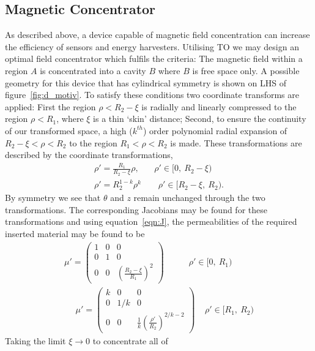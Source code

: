 \documentclass[11pt]{iopart}
\begin{document}
\subsection{Magnetic Concentrator}
As described above, a device capable of magnetic field concentration
can increase the efficiency of sensors and energy harvesters.
Utilising TO we may design an optimal field concentrator which fulfils
the criteria: The magnetic field within a region $A$ is concentrated
into a cavity $B$ where $B$ is free space only. A possible geometry
for this device that has cylindrical symmetry is shown on LHS of
figure~\ref{fig:d_motiv}.  To satisfy these conditions two coordinate
transforms are applied: First the region $\rho < R_2 - \xi$ is
radially and linearly compressed to the region $\rho < R_1$, where
$\xi$ is a thin `skin' distance; Second, to ensure the continuity of
our transformed space, a high ($k^{th}$) order polynomial radial
expansion of $R_2 - \xi < \rho < R_2$ to the region $R_1 < \rho < R_2$
is made. These transformations are described by the coordinate
transformations,
\begin{equation}
  \label{eqn:transform}
  \begin{split}
\rho' = \frac{R_1}{R_2-\xi}\rho,~~~~~~~~\rho'\in[0,~R_2-\xi)~~\\
\rho' = R_2^{1-k}\rho^k~~~~~~~~~\rho'\in[R_2-\xi,~R_2).
  \end{split}
\end{equation}
By symmetry we see that $\theta$ and $z$ remain unchanged through the
two transformations. The corresponding Jacobians may be found for
these transformations and using equation~\ref{eqn:J}, the
permeabilities of the required inserted material may be found to be
\begin{equation}
  \label{eqn:mat}
  \begin{split}
 \mu' = \begin{pmatrix}1&0&0\\0&1&0\\0&0&(\frac{R_2-\xi}{R_1})^2\end{pmatrix}~~~~~~~~~~~~~\rho'\in[0,~R_1)~~\\
~~~~~~\mu' = \begin{pmatrix}k&0&0\\0&1/k&0\\0&0&\frac{1}{k}(\frac{\rho'}{R_2})^{2/k-2}\end{pmatrix}~~~~~\rho'\in[R_1,~R_2)
  \end{split}
\end{equation}
Taking the limit $\xi \rightarrow 0$ to concentrate all of
\end{document}

